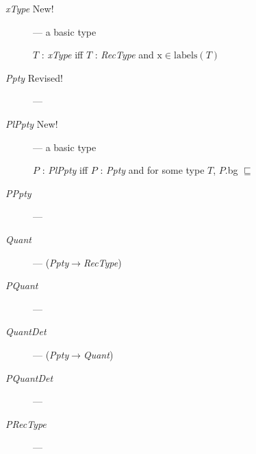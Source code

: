\begin{description}
      
      
    \item[\textnormal{\textit{xType}} New!] --- a basic type

      $T$ : \textit{xType} iff $T$ : \textit{RecType} and $\text{x}\in\mathrm{labels}(T)$

      \item[\textnormal{\textit{Ppty}} Revised!] ---
        
      \item[\textnormal{\textit{PlPpty}} New!] --- a basic type

        $P$ : \textit{PlPpty} iff $P$ : \textit{Ppty} and for some type $T$,
$P$.bg $\sqsubseteq$  
        
      \item[\textnormal{\textit{PPpty}}] --- 
        
      \item[\textnormal{\textit{Quant}}] ---
        (\textit{Ppty}$\rightarrow$\textit{RecType})
        
      \item[\textnormal{\textit{PQuant}}] --- 
        
      \item[\textnormal{\textit{QuantDet}}] ---
        (\textit{Ppty}$\rightarrow$\textit{Quant})
        
      \item[\textnormal{\textit{PQuantDet}}] ---
        
      \item[\textnormal{\textit{PRecType}}] ---
          


\end{description}
